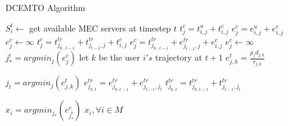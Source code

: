 \documentclass[conference]{IEEEtran}
\begin{document}
 \begin{algorithm}
 \caption{DCEMTO Algorithm}
 \begin{algorithmic}[1]
 \renewcommand{\algorithmicrequire}{\textbf{Input: mobile users $N$, base stations $M$}}
 \renewcommand{\algorithmicensure}{\textbf{Output: $x_i ,\forall i \in M$}}
 \REQUIRE 
 \ENSURE  

  \STATE $S_i^t \mathrm{\leftarrow }$ get available MEC servers at timestep $t$
  \STATE $t^c_j=t^u_{i,j}+t^c_{i,j}$
  \STATE $e^c_j=e^u_{i,j}+e^c_{i,j}$
  \ELSE
  \STATE $e^c_j \mathrm{\leftarrow } \mathrm{\infty }$
  \ENDIF
  \ELSE
  \STATE $t^c_j=t^{tr}_{j_{0\dots t-1}}+t^{tr}_{j_{t-1},j}+t^c_{i,j}$
  \STATE $e^c_j=t^{tr}_{j_{0\dots t-1}}+e^{tr}_{j_{t-1},j}+e^c_{i,j}$
  \ELSE
  \STATE $e^c_j \mathrm{\leftarrow } \mathrm{\infty }$
  \ENDIF
  \ENDIF
  \ENDFOR
  \STATE $j^t_*=argmin_j(e^c_j)$
  \STATE let $k$ be the user $i's$ trajectory at $t+1$
  \STATE $e^t_{j,k}=\frac{p_jd_{j,k}}{r_{j,k}}$
  \ENDFOR
  
  \STATE $j_t=argmin_j(e^t_{j,k})$
  \STATE $ e^{tr}_{j_{0..t}}=e^{tr}_{j_{0..t-1}}+e^{tr}_{j_{t-1},j_t}$
  \STATE $t^{tr}_{j_{0..t}}=t^{tr}_{j_{0..t-1}}+t^{tr}_{j_{t-1},j_t}$
 
  \ENDFOR
  \STATE $x_i=argmin_{j_*}(e^c_{j^t_*})$
  \ENDFOR
 \RETURN $x_i ,\forall i \in M$ 
 \end{algorithmic} 
 \end{algorithm}
 
\end{document}
